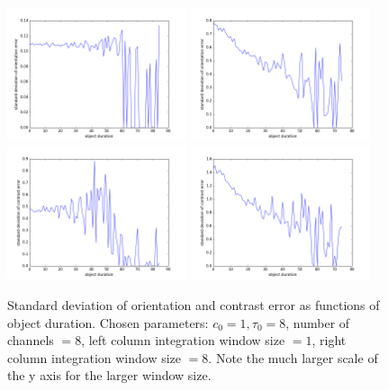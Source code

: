 \documentclass{scrartcl}
\begin{document}
\begin{figure}[h]
\centering
\includegraphics[width=0.47\textwidth, clip]{../pics/t5/oridur_highnum_1_8_1_8}
\includegraphics[width=0.47\textwidth, clip]{../pics/t5/oridur_highnum_1_8_8_8}\\
\includegraphics[width=0.47\textwidth, clip]{../pics/t5/condur_highnum_1_8_1_8}
\includegraphics[width=0.47\textwidth, clip]{../pics/t5/condur_highnum_1_8_8_8}\\
\caption{Standard deviation of orientation and contrast error as functions of object duration. Chosen parameters: $c_0 = 1, \tau_0 = 8$, number of channels $=8$, left column integration window size $=1$, right column integration window size $=8$. Note the much larger scale of the y axis for the larger window size.}
\label{stds}
\end{figure}
\end{document}

